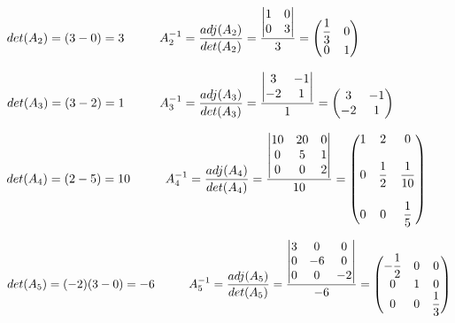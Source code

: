 \documentclass[fleqn]{article}
\begin{document}
\begin{enumerate}
      \textcolor{hwColor}{
        $
        det(A_2)=(3-0)=3
        \hskip 1truecm
        A_2^{-1}=\dfrac{adj(A_2)}{det(A_2)}=\dfrac{
          \begin{vmatrix}
            1 & 0 \\
            0 & 3
          \end{vmatrix}
        }{3}=\begin{pmatrix}
          \dfrac{1}{3} & 0 \\
          0 & 1 \\
        \end{pmatrix}
        $
      }

      \textcolor{hwColor}{
        $
        det(A_3)=(3-2)=1
        \hskip 1truecm
        A_3^{-1}=\dfrac{adj(A_3)}{det(A_3)}=\dfrac{
          \begin{vmatrix}
            3 & -1 \\
            -2 & 1 \\
          \end{vmatrix}
        }{1}=
        \begin{pmatrix}
          3 & -1 \\
          -2 & 1 \\
        \end{pmatrix}
        $
      }

      \textcolor{hwColor}{
        $
        det(A_4)=(2-5)=10
        \hskip 1truecm
        A_4^{-1}=\dfrac{adj(A_4)}{det(A_4)}=\dfrac{
          \begin{vmatrix}
           10 & 20 & 0 \\
           0 & 5 & 1 \\
           0 & 0 & 2 \\
          \end{vmatrix}
        }{10}=\begin{pmatrix}
          1 & 2 & 0 \\
          \\
          0 & \dfrac{1}{2}& \dfrac{1}{10} \\
          \\
          0 & 0 & \dfrac{1}{5}\\
        \end{pmatrix}
        $
      }

      \textcolor{hwColor}{
        $
        det(A_5)=(-2)(3-0)=-6
        \hskip 1truecm
        A_5^{-1}=\dfrac{adj(A_5)}{det(A_5)}=\dfrac{
          \begin{vmatrix}
           3 & 0 & 0 \\
           0 & -6 & 0 \\
           0 & 0 & -2 \\
          \end{vmatrix}
        }{-6}=\begin{pmatrix}
          -\dfrac{1}{2}& 0 & 0 \\
          0 & 1 & 0 \\
          0 & 0 & \dfrac{1}{3}\\
        \end{pmatrix}
        $
      }


\end{enumerate}
\end{document}
